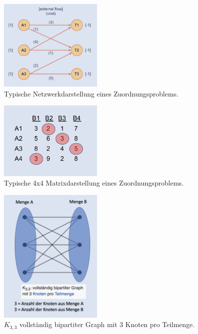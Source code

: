 \begin{figure}
\centering
\includegraphics[width=5cm]{papers/munkres/figures/Netzwerkdarstellung}
\caption{Typische Netzwerkdarstellung eines Zuordnungsproblems.}
\label{munkres:Vr2}
\end{figure}

\begin{figure}
\centering
\includegraphics[width=5cm]{papers/munkres/figures/Matrixdarstellung}
\caption{Typische 4x4 Matrixdarstellung eines Zuordnungsproblems.}
\label{munkres:Vr2}
\end{figure}

\begin{figure}
\centering
\includegraphics[width=5cm]{papers/munkres/figures/bipartiter_graph}
\caption{$K_{3,3}$ vollständig bipartiter Graph mit 3 Knoten pro Teilmenge.}
\label{munkres:Vr2}
\end{figure}
